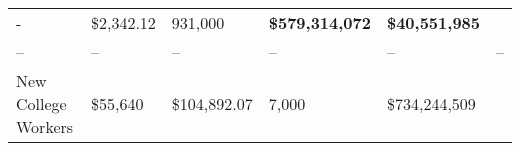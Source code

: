 \documentclass[11pt]{article}
\begin{document}
\begin{longtable}[]{@{}llllll@{}}
\begin{minipage}[t]{0.14\columnwidth}
-\strut
\end{minipage} & \begin{minipage}[t]{0.13\columnwidth}\raggedright
\$2,342.12\strut
\end{minipage} & \begin{minipage}[t]{0.13\columnwidth}\raggedright
931,000\strut
\end{minipage} & \begin{minipage}[t]{0.13\columnwidth}\raggedright
\textbf{\$579,314,072}\strut
\end{minipage} & \begin{minipage}[t]{0.13\columnwidth}\raggedright
\textbf{\$40,551,985}\strut
\end{minipage}\tabularnewline
\begin{minipage}[t]{0.19\columnwidth}\raggedright
--\strut
\end{minipage} & \begin{minipage}[t]{0.14\columnwidth}\raggedright
--\strut
\end{minipage} & \begin{minipage}[t]{0.13\columnwidth}\raggedright
--\strut
\end{minipage} & \begin{minipage}[t]{0.13\columnwidth}\raggedright
--\strut
\end{minipage} & \begin{minipage}[t]{0.13\columnwidth}\raggedright
--\strut
\end{minipage} & \begin{minipage}[t]{0.13\columnwidth}\raggedright
--\strut
\end{minipage}\tabularnewline
\begin{minipage}[t]{0.19\columnwidth}\raggedright
New College Workers\strut
\end{minipage} & \begin{minipage}[t]{0.14\columnwidth}\raggedright
\$55,640\strut
\end{minipage} & \begin{minipage}[t]{0.13\columnwidth}\raggedright
\$104,892.07\strut
\end{minipage} & \begin{minipage}[t]{0.13\columnwidth}\raggedright
7,000\strut
\end{minipage} & \begin{minipage}[t]{0.13\columnwidth}\raggedright
\$734,244,509\strut
\end{minipage} & \begin{minipage}[t]{0.13\columnwidth}\raggedright

\end{minipage}
\end{longtable}
\end{document}
